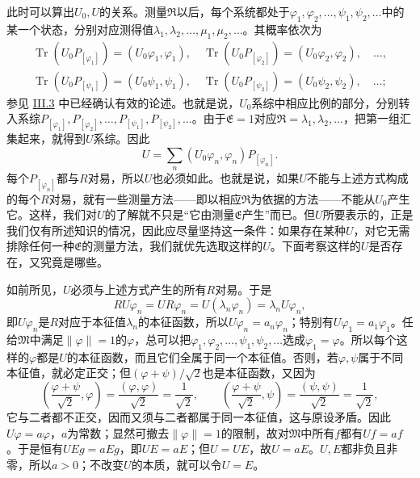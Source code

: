 \documentclass[fontsize=13pt,twoside,openany,headings=normal,parskip=false,bookmarkpackage=false,DIV=calc]{scrbook}
\begin{document}
此时可以算出$U_0,\allowbreak U$的关系。测量$\mathfrak R$以后，每个系统都处于$\varphi_1,\allowbreak \varphi_2,\allowbreak \ldots,\allowbreak \psi_1,\allowbreak \psi_2,\allowbreak \ldots$中的某一个状态，分别对应测得值$\lambda_1,\allowbreak \lambda_2,\allowbreak \ldots,\allowbreak \mu_1,\allowbreak \mu_2,\allowbreak \ldots$。其概率依次为
\begin{gather*}
\operatorname{Tr}(U_0P_{[\varphi_1]})=(U_0\varphi_1,\varphi_1),\quad
\operatorname{Tr}(U_0P_{[\varphi_2]})=(U_0\varphi_2,\varphi_2),\quad\ldots,\\
\operatorname{Tr}(U_0P_{[\psi_1]})=(U_0\psi_1,\psi_1),\quad
\operatorname{Tr}(U_0P_{[\psi_2]})=(U_0\psi_2,\psi_2),\quad\ldots;
\end{gather*}
参见 \hyperref[sec:III.3]{III.3} 中已经确认有效的论述。也就是说，$U_0$系综中相应比例的部分，分别转入系综$P_{[\varphi_1]},\allowbreak P_{[\varphi_2]},\allowbreak \ldots,\allowbreak P_{[\psi_1]},\allowbreak P_{[\psi_2]},\allowbreak \ldots$。由于$\mathfrak E=1$对应$\mathfrak R=\lambda_1,\allowbreak \lambda_2,\allowbreak \ldots$，把第一组汇集起来，就得到$U$系综。因此
\[
U=\sum_n(U_0\varphi_n,\varphi_n)P_{[\varphi_n]}.
\]
每个$P_{[\varphi_n]}$都与$R$对易，所以$U$也必须如此。也就是说，如果$U$不能与上述方式构成的每个$R$对易，就有一些测量方法——即以相应$\mathfrak R$为依据的方法——不能从$U_0$产生它。这样，我们对$U$的了解就不只是“它由测量$\mathfrak E$产生”而已。但$U$所要表示的，正是我们仅有所述知识的情况，因此应尽量坚持这一条件：如果存在某种$U$，对它无需排除任何一种$\mathfrak E$的测量方法，我们就优先选取这样的$U$。下面考察这样的$U$是否存在，又究竟是哪些。

\hypertarget{origpage-182}{}\label{origpage-182}如前所见，$U$必须与上述方式产生的所有$R$对易。于是
\[
RU\varphi_n=UR\varphi_n=U(\lambda_n\varphi_n)=\lambda_nU\varphi_n,
\]
即$U\varphi_n$是$R$对应于本征值$\lambda_n$的本征函数，所以$U\varphi_n=a_n\varphi_n$；特别有$U\varphi_1=a_1\varphi_1$。任给$\mathfrak M$中满足$\|\varphi\|=1$的$\varphi$，总可以把$\varphi_1,\allowbreak \varphi_2,\allowbreak \ldots,\allowbreak \psi_1,\allowbreak \psi_2,\allowbreak \ldots$选成$\varphi_1=\varphi$。所以每个这样的$\varphi$都是$U$的本征函数，而且它们全属于同一个本征值。否则，若$\varphi,\allowbreak \psi$属于不同本征值，就必定正交；但$(\varphi+\psi)/\sqrt2$也是本征函数，又因为
\[
\left(\frac{\varphi+\psi}{\sqrt2},\varphi\right)=\frac{(\varphi,\varphi)}{\sqrt2}=\frac1{\sqrt2},\qquad
\left(\frac{\varphi+\psi}{\sqrt2},\psi\right)=\frac{(\psi,\psi)}{\sqrt2}=\frac1{\sqrt2},
\]
它与二者都不正交，因而又须与二者都属于同一本征值，这与原设矛盾。因此$U\varphi=a\varphi$，$a$为常数；显然可撤去$\|\varphi\|=1$的限制，故对$\mathfrak M$中所有$f$都有$Uf=af$。于是恒有$UEg=aEg$，即$UE=aE$；但$U=UE$，故$U=aE$。$U,\allowbreak E$都非负且非零，所以$a>0$；不改变$U$的本质，就可以令$U=E$。
\end{document}
